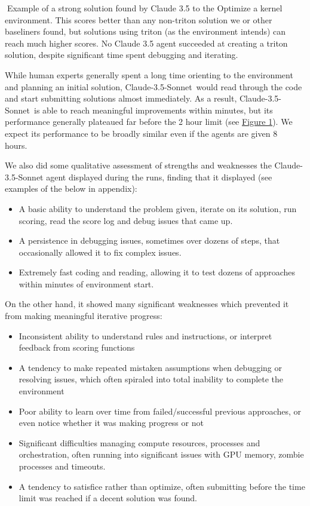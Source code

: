 \documentclass[
]{article}
\providecommand{\tightlist}{%
  \setlength{\itemsep}{0pt}\setlength{\parskip}{0pt}}
\begin{document}
{}{Example of a strong solution found by Claude 3.5 to the Optimize a
kernel environment. This scores better than any non-triton solution we
or other baseliners found, but solutions using triton (as the
environment intends) can reach much higher scores. No Claude 3.5 agent
succeeded at creating a triton solution, despite significant time spent
debugging and iterating.}

{}

{While human experts generally spent a long time orienting to the
environment and planning an initial solution,
}{Claude-3.5-Sonnet}{~would read through the code and start submitting
solutions almost immediately. As a result, }{Claude-3.5-Sonnet}{~is able
to reach meaningful improvements within minutes, but its performance
generally plateaued far before the 2 hour limit (see
}{\hyperref[id.mf3qlnxl0yyh]{Figure 1}}{). We expect its performance to
be broadly similar even if the agents are given 8 hours.}{~}

{}

{We also did some qualitative assessment of strengths and weaknesses the
Claude-3.5-Sonnet agent displayed during the runs, finding that it
displayed (see examples of the below in appendix):}

\begin{itemize}
\tightlist
\item
  {A basic ability to understand the problem given, iterate on its
  solution, run scoring, read the score log and debug issues that came
  up. }
\item
  {A persistence in debugging issues, sometimes over dozens of steps,
  that occasionally allowed it to fix complex issues.}
\item
  {Extremely fast coding and reading, allowing it to test dozens of
  approaches within minutes of environment start. }
\end{itemize}

{On the other hand, it showed many significant weaknesses which
prevented it from making meaningful iterative progress:}

\begin{itemize}
\tightlist
\item
  {Inconsistent ability to understand rules and instructions, or
  interpret feedback from scoring functions}
\item
  {A tendency to make repeated mistaken assumptions when debugging or
  resolving issues, which often spiraled into total inability to
  complete the environment}
\item
  {Poor ability to learn over time from failed/successful previous
  approaches, or even notice whether it was making progress or not}
\item
  {Significant difficulties managing compute resources, processes and
  orchestration, often running into significant issues with GPU memory,
  zombie processes and timeouts. }
\item
  {A tendency to satisfice rather than optimize, often submitting before
  the time limit was reached if a decent solution was found. }
\end{itemize}
\end{document}
